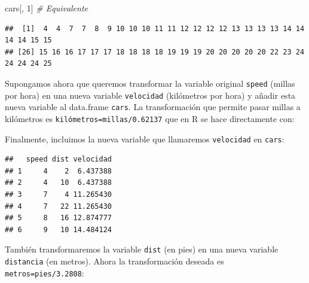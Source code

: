 \documentclass[
]{book}
\newenvironment{Shaded}{\begin{snugshade}}{\end{snugshade}}
\newcommand{\CommentTok}[1]{\textcolor[rgb]{0.56,0.35,0.01}{\textit{#1}}}
\newcommand{\DecValTok}[1]{\textcolor[rgb]{0.00,0.00,0.81}{#1}}
\newcommand{\FloatTok}[1]{\textcolor[rgb]{0.00,0.00,0.81}{#1}}
\newcommand{\FunctionTok}[1]{\textcolor[rgb]{0.13,0.29,0.53}{\textbf{#1}}}
\newcommand{\NormalTok}[1]{#1}
\newcommand{\OtherTok}[1]{\textcolor[rgb]{0.56,0.35,0.01}{#1}}
\newcommand{\SpecialCharTok}[1]{\textcolor[rgb]{0.81,0.36,0.00}{\textbf{#1}}}
\begin{document}
\begin{Shaded}
\begin{Highlighting}[]
\NormalTok{cars[, }\DecValTok{1}\NormalTok{]  }\CommentTok{\# Equivalente}
\end{Highlighting}
\end{Shaded}

\begin{verbatim}
##  [1]  4  4  7  7  8  9 10 10 10 11 11 12 12 12 12 13 13 13 13 14 14 14 14 15 15
## [26] 15 16 16 17 17 17 18 18 18 18 19 19 19 20 20 20 20 20 22 23 24 24 24 24 25
\end{verbatim}

Supongamos ahora que queremos transformar la variable original \texttt{speed}
(millas por hora) en una nueva variable \texttt{velocidad} (kilómetros por
hora) y añadir esta nueva variable al data.frame \texttt{cars}.
La transformación que permite pasar millas a kilómetros es
\texttt{kilómetros=millas/0.62137} que en R se hace directamente con:

\begin{Shaded}
\end{Shaded}

Finalmente, incluimos la nueva variable que llamaremos
\texttt{velocidad} en \texttt{cars}:

\begin{Shaded}
\end{Shaded}

\begin{verbatim}
##   speed dist velocidad
## 1     4    2  6.437388
## 2     4   10  6.437388
## 3     7    4 11.265430
## 4     7   22 11.265430
## 5     8   16 12.874777
## 6     9   10 14.484124
\end{verbatim}

También transformaremos la variable \texttt{dist} (en pies) en una nueva
variable \texttt{distancia} (en metros). Ahora la transformación deseada es
\texttt{metros=pies/3.2808}:

\begin{Shaded}
\end{Shaded}
\end{document}
